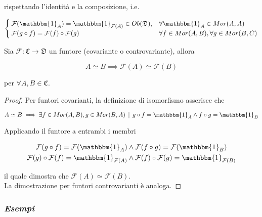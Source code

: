 rispettando l'identità e la composizione, i.e.

\begin{equation}
	\begin{cases}
		\mathcal{F}(\mathbbm{1}_{A}) = \mathbbm{1}_{\mathcal{F}(A)} \in Ob(\mathfrak{D}), & \forall \mathbbm{1}_{A} \in Mor(A,A)\\
		\mathcal{F}(g \circ f) = \mathcal{F}(f) \circ \mathcal{F}(g) & \forall f \in Mor(A,B), \forall g \in Mor(B,C)
	\end{cases}
\end{equation}

\begin{remark}
	Sia $ \mathcal{F} : \mathfrak{C} \to \mathfrak{D} $ un funtore (covariante o controvariante), allora
	
	\begin{equation}
		A \simeq B \implies \mathcal{F}(A) \simeq \mathcal{F}(B)
	\end{equation}
	
	per $ \forall A,B \in \mathfrak{C} $.
\end{remark}

\begin{proof}
	Per funtori covarianti, la definizione di isomorfismo asserisce che
	
	\begin{equation}
		A \simeq B \implies \exists f \in Mor(A,B), g \in Mor(B,A) \, \mid \, g \circ f = \mathbbm{1}_{A} \wedge f \circ g = \mathbbm{1}_{B}
	\end{equation}
	
	Applicando il funtore a entrambi i membri
	
	\begin{align}
		\begin{split}
			\mathcal{F}(g \circ f) = \mathcal{F}(\mathbbm{1}_{A}) &\wedge \mathcal{F}(f \circ g) = \mathcal{F}(\mathbbm{1}_{B})\\
			\mathcal{F}(g) \circ \mathcal{F}(f) = \mathbbm{1}_{\mathcal{F}(A)} &\wedge \mathcal{F}(f) \circ \mathcal{F}(g) = \mathbbm{1}_{\mathcal{F}(B)}
		\end{split}
	\end{align}
	
	il quale dimostra che $ \mathcal{F}(A) \simeq \mathcal{F}(B) $.\\
	La dimostrazione per funtori controvarianti è analoga.
\end{proof}

\subsubsection{\textit{Esempi}}

